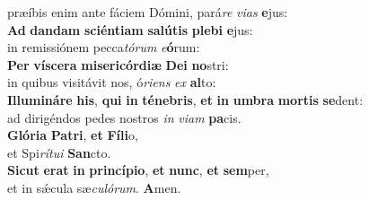 \oddverse præíbis enim ante fáciem Dómini, pará\textit{re} \textit{vi}\textit{as} \textbf{e}jus:\\
\evenverse \textbf{Ad} \textbf{dan}\textbf{dam} \textbf{sci}\textbf{én}\textbf{ti}\textbf{am} \textbf{sa}\textbf{lú}\textbf{tis} \textbf{ple}\textbf{bi} \textbf{e}jus:~\*\\
\evenverse in remissiónem pecca\textit{tó}\textit{rum} \textit{e}\textbf{ó}rum:\\
\oddverse \textbf{Per} \textbf{ví}\textbf{sce}\textbf{ra} \textbf{mi}\textbf{se}\textbf{ri}\textbf{cór}\textbf{di}\textbf{æ} \textbf{De}\textbf{i} \textbf{no}stri:~\*\\
\oddverse in quibus visitávit nos, ó\textit{ri}\textit{ens} \textit{ex} \textbf{al}to:\\
\evenverse \textbf{Il}\textbf{lu}\textbf{mi}\textbf{ná}\textbf{re} \textbf{his}, \textbf{qui} \textbf{in} \textbf{té}\textbf{ne}\textbf{bris}, \textbf{et} \textbf{in} \textbf{um}\textbf{bra} \textbf{mor}\textbf{tis} \textbf{se}dent:~\*\\
\evenverse ad dirigéndos pedes nostros \textit{in} \textit{vi}\textit{am} \textbf{pa}cis.\\
\oddverse \textbf{Gló}\textbf{ri}\textbf{a} \textbf{Pa}\textbf{tri}, \textbf{et} \textbf{Fí}\textbf{li}o,~\*\\
\oddverse et Spi\textit{rí}\textit{tu}\textit{i} \textbf{San}cto.\\
\evenverse \textbf{Si}\textbf{cut} \textbf{e}\textbf{rat} \textbf{in} \textbf{prin}\textbf{cí}\textbf{pi}\textbf{o}, \textbf{et} \textbf{nunc}, \textbf{et} \textbf{sem}per,~\*\\
\evenverse et in sǽcula sæ\textit{cu}\textit{ló}\textit{rum}. \textbf{A}men.\\
